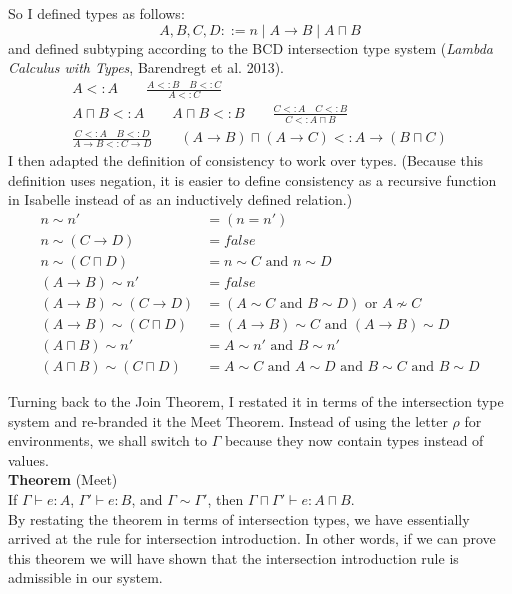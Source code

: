 \documentclass{article}
\begin{document}
So I defined types as follows:
\[
  A,B,C,D ::= n \mid A \to B \mid A \sqcap B
\]
and defined subtyping according to the BCD intersection type system
(\emph{Lambda Calculus with Types}, Barendregt et al. 2013).
\begin{gather*}
A <: A \qquad \frac{A <: B \quad B <: C}{A <: C} \\[2ex]
A \sqcap B <: A \qquad
A \sqcap B <: B \qquad
\frac{C <: A \quad C <: B}{C <: A \sqcap B} \\[2ex]
\frac{C <: A \quad B <: D}{A \to B <: C \to D}
\qquad
(A\to B) \sqcap (A \to C) <: A \to (B \sqcap C)
\end{gather*}
I then adapted the definition of consistency to work over types.
(Because this definition uses negation, it is easier to define
consistency as a recursive function in Isabelle instead of as an
inductively defined relation.)
\begin{align*}
 n \sim n' &= (n = n') \\
 n \sim (C \to D) &= \mathit{false} \\
 n \sim (C \sqcap D) &= n \sim C \text{ and } n \sim D \\
 (A \to B) \sim n' &= \mathit{false} \\
 (A \to B) \sim (C \to D) &= 
    (A \sim C \text{ and } B \sim D) \text{ or } A \not\sim C \\
 (A \to B) \sim (C \sqcap D) &=
    (A \to B) \sim C \text{ and } (A \to B) \sim D \\
 (A \sqcap B) \sim n' &= A \sim n' \text{ and } B \sim n' \\
 (A \sqcap B) \sim (C \sqcap D) &= 
    A \sim C \text{ and } A \sim D \text{ and } 
    B \sim C \text{ and } B \sim D
\end{align*}

Turning back to the Join Theorem, I restated it in terms of the
intersection type system and re-branded it the Meet Theorem. Instead of
using the letter $\rho$ for environments, we shall switch to $\Gamma$
because they now contain types instead of values. \\

\noindent \textbf{Theorem} (Meet)\\
  If $\Gamma \vdash e : A$, $\Gamma' \vdash e : B$, and $\Gamma \sim
  \Gamma'$, 
  then $\Gamma\sqcap\Gamma' \vdash e : A \sqcap B$. \\

By restating the theorem in terms of intersection types, we have
essentially arrived at the rule for intersection introduction.  In
other words, if we can prove this theorem we will have shown that the
intersection introduction rule is admissible in our system.
\end{document}
